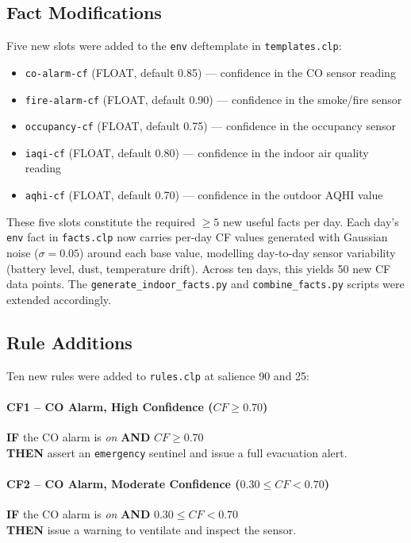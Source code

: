 \documentclass{article}
\begin{document}
\subsection{Fact Modifications}

Five new slots were added to the \texttt{env} deftemplate in \texttt{templates.clp}:

\begin{itemize}
    \item \texttt{co-alarm-cf} (FLOAT, default 0.85) — confidence in the CO sensor reading
    \item \texttt{fire-alarm-cf} (FLOAT, default 0.90) — confidence in the smoke/fire sensor
    \item \texttt{occupancy-cf} (FLOAT, default 0.75) — confidence in the occupancy sensor
    \item \texttt{iaqi-cf} (FLOAT, default 0.80) — confidence in the indoor air quality reading
    \item \texttt{aqhi-cf} (FLOAT, default 0.70) — confidence in the outdoor AQHI value
\end{itemize}

These five slots constitute the required $\geq 5$ new useful facts per day. Each day's \texttt{env} fact in \texttt{facts.clp} now carries per-day CF values generated with Gaussian noise ($\sigma = 0.05$) around each base value, modelling day-to-day sensor variability (battery level, dust, temperature drift). Across ten days, this yields 50 new CF data points. The \texttt{generate\_indoor\_facts.py} and \texttt{combine\_facts.py} scripts were extended accordingly.

\subsection{Rule Additions}

Ten new rules were added to \texttt{rules.clp} at salience 90 and 25:

\paragraph{CF1 -- CO Alarm, High Confidence ($CF \geq 0.70$)}
\textbf{IF} the CO alarm is \emph{on} \textbf{AND} $CF \geq 0.70$ \\
\textbf{THEN} assert an \texttt{emergency} sentinel and issue a full evacuation alert.

\paragraph{CF2 -- CO Alarm, Moderate Confidence ($0.30 \leq CF < 0.70$)}
\textbf{IF} the CO alarm is \emph{on} \textbf{AND} $0.30 \leq CF < 0.70$ \\
\textbf{THEN} issue a warning to ventilate and inspect the sensor.
\end{document}
